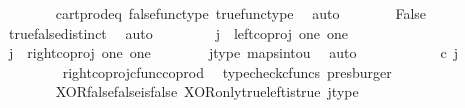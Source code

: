 \begin{isabellebody}
\ \ \ \ \ \ \isamarkupfalse%
\ cart{\isacharunderscore}{\kern0pt}prod{\isacharunderscore}{\kern0pt}eq{}\ false{\isacharunderscore}{\kern0pt}func{\isacharunderscore}{\kern0pt}type\ true{\isacharunderscore}{\kern0pt}func{\isacharunderscore}{\kern0pt}type\ \isamarkupfalse%
\ auto\isanewline
\ \ \ \ \isamarkupfalse%
\ \isamarkupfalse%
\ False\isanewline
\ \ \ \ \ \ \isamarkupfalse%
\ true{\isacharunderscore}{\kern0pt}false{\isacharunderscore}{\kern0pt}distinct\ \isamarkupfalse%
\ auto\isanewline
\ \ \isamarkupfalse%
\isanewline
\ \ \ \ \isamarkupfalse%
\ {\isachardoublequoteopen}j\ {\isasymnoteq}\ left{\isacharunderscore}{\kern0pt}coproj\ one\ one{\isachardoublequoteclose}\isanewline
\ \ \ \ \isamarkupfalse%
\ \isamarkupfalse%
\ {\isachardoublequoteopen}j\ {\isacharequal}{\kern0pt}\ right{\isacharunderscore}{\kern0pt}coproj\ one\ one{\isachardoublequoteclose}\isanewline
\ \ \ \ \ \ \isamarkupfalse%
\ j{\isacharunderscore}{\kern0pt}type\ maps{\isacharunderscore}{\kern0pt}into{\isacharunderscore}{\kern0pt}{}u{}\ \isamarkupfalse%
\ auto\isanewline
\ \ \ \ \isamarkupfalse%
\ \isamarkupfalse%
\ {\isachardoublequoteopen}{\isacharparenleft}{\kern0pt}{\isasymlangle}{\isasymt}{\isacharcomma}{\kern0pt}\ {\isasymt}{\isasymrangle}\ {\isasymamalg}{\isasymlangle}{\isasymf}{\isacharcomma}{\kern0pt}\ {\isasymf}{\isasymrangle}{\isacharparenright}{\kern0pt}\ {\isasymcirc}\isactrlsub c\ j\ \ {\isacharequal}{\kern0pt}\ {\isasymlangle}{\isasymf}{\isacharcomma}{\kern0pt}\ {\isasymf}{\isasymrangle}{\isachardoublequoteclose}\isanewline
\ \ \ \ \ \ \isamarkupfalse%
\ \ right{\isacharunderscore}{\kern0pt}coproj{\isacharunderscore}{\kern0pt}cfunc{\isacharunderscore}{\kern0pt}coprod\ \isamarkupfalse%
\ {\isacharparenleft}{\kern0pt}typecheck{\isacharunderscore}{\kern0pt}cfuncs{\isacharcomma}{\kern0pt}\ presburger{\isacharparenright}{\kern0pt}\isanewline
\ \ \ \ \isamarkupfalse%
\ \isamarkupfalse%
\ {\isachardoublequoteopen}{\isasymlangle}{\isasymf}{\isacharcomma}{\kern0pt}\ {\isasymt}{\isasymrangle}\ {\isacharequal}{\kern0pt}\ {\isasymlangle}{\isasymf}{\isacharcomma}{\kern0pt}\ {\isasymf}{\isasymrangle}{\isachardoublequoteclose}\isanewline
\ \ \ \ \ \ \isamarkupfalse%
\ XOR{\isacharunderscore}{\kern0pt}false{\isacharunderscore}{\kern0pt}false{\isacharunderscore}{\kern0pt}is{\isacharunderscore}{\kern0pt}false\ XOR{\isacharunderscore}{\kern0pt}only{\isacharunderscore}{\kern0pt}true{\isacharunderscore}{\kern0pt}left{\isacharunderscore}{\kern0pt}is{\isacharunderscore}{\kern0pt}true\ j{\isacharunderscore}{\kern0pt}type\ \isamarkupfalse%

\end{isabellebody}
